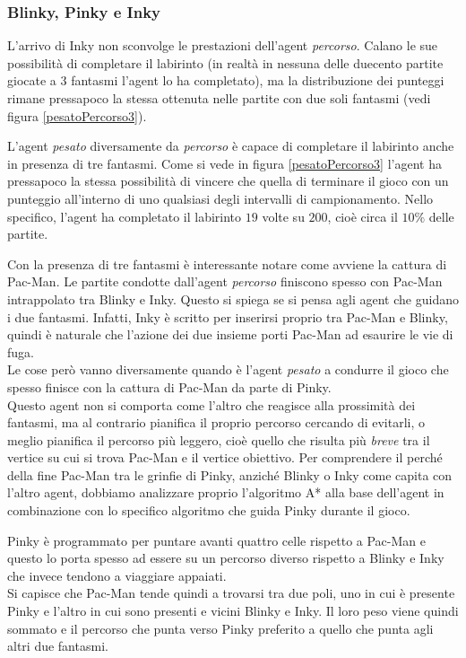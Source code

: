 \documentclass[8pt]{book}
\begin{document}
\subsubsection{Blinky, Pinky e Inky}

L'arrivo di Inky non sconvolge le prestazioni dell'agent \emph{percorso}. Calano le sue possibilità di completare il labirinto (in realtà in nessuna delle duecento partite giocate a $3$ fantasmi l'agent lo ha completato), ma la distribuzione dei punteggi rimane pressapoco la stessa ottenuta nelle partite con due soli fantasmi (vedi figura \ref{pesatoPercorso3}).

L'agent \emph{pesato} diversamente da \emph{percorso} è capace di completare il labirinto anche in presenza di tre fantasmi. Come si vede in figura \ref{pesatoPercorso3} l'agent ha pressapoco la stessa possibilità di vincere che quella di terminare il gioco con un punteggio all'interno di uno qualsiasi degli intervalli di campionamento. Nello specifico, l'agent ha completato il labirinto $19$ volte su $200$, cioè circa il $10\%$ delle partite.

Con la presenza di tre fantasmi è interessante notare come avviene la cattura di Pac-Man. Le partite condotte dall'agent \emph{percorso} finiscono spesso con Pac-Man intrappolato tra Blinky e Inky. Questo si spiega se si pensa agli agent che guidano i due fantasmi. Infatti, Inky è scritto per inserirsi proprio tra Pac-Man e Blinky, quindi è naturale che l'azione dei due insieme porti Pac-Man ad esaurire le vie di fuga.\\
Le cose però vanno diversamente quando è l'agent \emph{pesato} a condurre il gioco che spesso finisce con la cattura di Pac-Man da parte di Pinky.\\
Questo agent non si comporta come l'altro che reagisce alla prossimità dei fantasmi, ma al contrario pianifica il proprio percorso cercando di evitarli, o meglio pianifica il percorso più leggero, cioè quello che risulta più \emph{breve} tra il vertice su cui si trova Pac-Man e il vertice obiettivo. Per comprendere il perché della fine Pac-Man tra le grinfie di Pinky, anziché Blinky o Inky come capita con l'altro agent, dobbiamo analizzare proprio l'algoritmo A* alla base dell'agent in combinazione con lo specifico algoritmo che guida Pinky durante il gioco.

Pinky è programmato per puntare avanti quattro celle rispetto a Pac-Man e questo lo porta spesso ad essere su un percorso diverso rispetto a Blinky e Inky che invece tendono a viaggiare appaiati.\\
Si capisce che Pac-Man tende quindi a trovarsi tra due poli, uno in cui è presente Pinky e l'altro in cui sono presenti e vicini Blinky e Inky. Il loro peso viene quindi sommato e il percorso che punta verso Pinky preferito a quello che punta agli altri due fantasmi.
\end{document}
